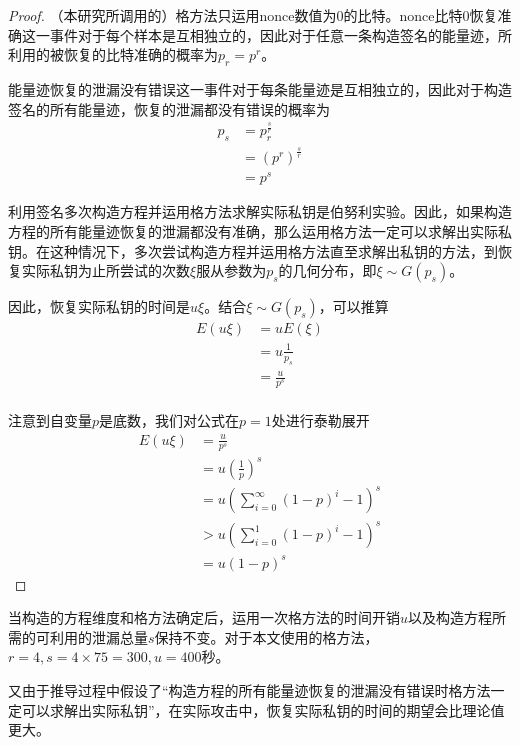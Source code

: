 {\begin{proof}
		（本研究所调用的）格方法只运用nonce数值为0的比特。nonce比特0恢复准确这一事件对于每个样本是互相独立的，因此对于任意一条构造签名的能量迹，所利用的被恢复的比特准确的概率为$p_r=p^r$。
	
		能量迹恢复的泄漏没有错误这一事件对于每条能量迹是互相独立的，因此对于构造签名的所有能量迹，恢复的泄漏都没有错误的概率为\begin{align*}
			p_s&=p_r^{\frac sr}\\
			&=\left(p^r \right) ^{\frac sr}\\
			&=p^s
		\end{align*}
	
		利用签名多次构造方程并运用格方法求解实际私钥是伯努利实验。因此，如果构造方程的所有能量迹恢复的泄漏都没有准确，那么运用格方法一定可以求解出实际私钥。在这种情况下，多次尝试构造方程并运用格方法直至求解出私钥的方法，到恢复实际私钥为止所尝试的次数$\xi$服从参数为$p_s$的几何分布，即$\xi\sim G(p_s)$。
		
		因此，恢复实际私钥的时间是$u\xi$。结合$\xi\sim G(p_s)$，可以推算\begin{align*}
			E(u\xi)&=uE(\xi)\\
			&=u\frac{1}{p_s}\\
			&=\frac{u}{p^s}\\
		\end{align*}
	
		注意到自变量$p$是底数，我们对公式在$p=1$处进行泰勒展开\begin{align*}
			E(u\xi)&=\frac{u}{p^s}\\
			&=u\left( \frac1p\right) ^s\\
			&=u\left( \sum\limits_{i=0}^{\infty}\left( 1-p\right) ^i-1\right) ^s\\
			&>u\left( \sum\limits_{i=0}^{1}\left( 1-p\right) ^i-1\right) ^s\\
			&=u\left( 1-p\right) ^s
		\end{align*}

	\end{proof}
	当构造的方程维度和格方法确定后，运用一次格方法的时间开销$u$以及构造方程所需的可利用的泄漏总量$s$保持不变。对于本文使用的格方法，$r=4,s=4\times75=300,u=400$秒。%
	
	又由于推导过程中假设了“构造方程的所有能量迹恢复的泄漏没有错误时格方法一定可以求解出实际私钥”，在实际攻击中，恢复实际私钥的时间的期望会比理论值更大。
	
}
